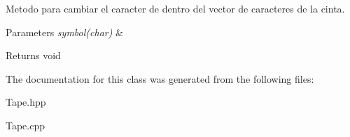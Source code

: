 Metodo para cambiar el caracter de dentro del vector de caracteres de la cinta. 


\begin{DoxyParams}{Parameters}
{\em symbol(char)} & \\
\hline
\end{DoxyParams}
\begin{DoxyReturn}{Returns}
void 
\end{DoxyReturn}


The documentation for this class was generated from the following files\+:\begin{DoxyCompactItemize}
\item 
Tape.\+hpp\item 
Tape.\+cpp\end{DoxyCompactItemize}
